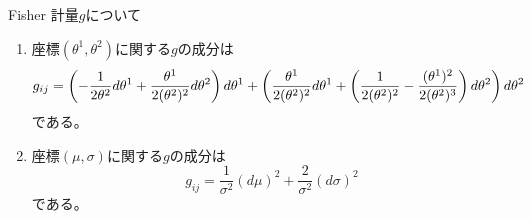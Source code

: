 \documentclass[report]{jlreq}
\begin{document}
\begin{proposition}
    Fisher 計量$g$について
    \begin{enumerate}
        \item 座標$(\theta^1, \theta^2)$に関する$g$の成分は
            \begin{equation}
                g_{ij}
                    =
                        \left({
                            -\frac{1}{2\theta^2}
                            d\theta^1
                            + \frac{\theta^1}{2(\theta^2)^2}
                            d\theta^2
                        }\right)
                        d\theta^1
                        +
                        \left({
                            \frac{\theta^1}{2(\theta^2)^2}
                            d\theta^1
                            + \left({
                                \frac{1}{2(\theta^2)^2}
                                - \frac{(\theta^1)^2}{2(\theta^2)^3}
                            }\right)
                            d\theta^2
                        }\right)
                        d\theta^2
            \end{equation}
            である。
        \item 座標$(\mu, \sigma)$に関する$g$の成分は
            \begin{equation}
                g_{ij}
                    =
                        \frac{1}{\sigma^2} (d\mu)^2
                        + \frac{2}{\sigma^2} (d\sigma)^2
            \end{equation}
            である。
    \end{enumerate}
\end{proposition}
\end{document}
